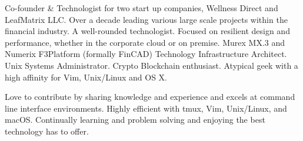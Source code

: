 

\begin{cvparagraph}

Co-founder \& Technologist for two start up companies, Wellness Direct and LeafMatrix LLC. Over a decade leading various large scale projects within the financial industry. A well-rounded technologist. Focused on resilient design and performance, whether in the corporate cloud or on premise. Murex MX.3 and Numerix F3Platform (formally FinCAD) Technology Infrastructure Architect. Unix Systems Administrator. Crypto Blockchain enthusiast. Atypical geek with a high affinity for Vim, Unix/Linux and OS X.

Love to contribute by sharing knowledge and experience and excels at command line interface environments. Highly efficient with tmux, Vim, Unix/Linux, and macOS. Continually learning and problem solving and enjoying the best technology has to offer.
\end{cvparagraph}

